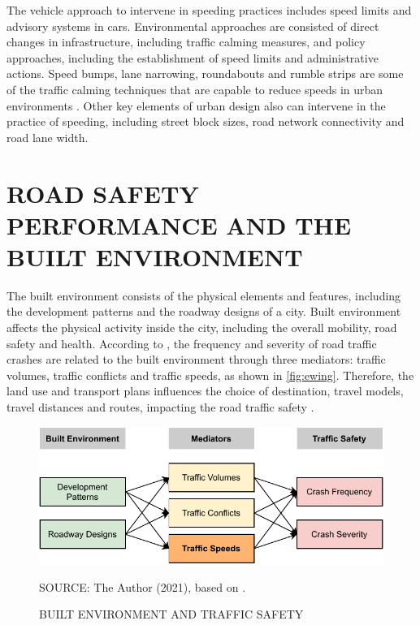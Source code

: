 The vehicle approach to intervene in speeding practices includes speed limits and advisory systems in cars. Environmental approaches are consisted of direct changes in infrastructure, including traffic calming measures, and policy approaches, including the establishment of speed limits and administrative actions. Speed bumps, lane narrowing, roundabouts and rumble strips are some of the traffic calming techniques that are capable to reduce speeds in urban environments \cite{Welle2016}. Other key elements of urban design also can intervene in the practice of speeding, including street block sizes, road network connectivity and road lane width.

\section{ROAD SAFETY PERFORMANCE AND THE BUILT ENVIRONMENT} \label{be}





The built environment consists of the physical elements and features, including the development patterns and the roadway designs of a city. Built environment affects the physical activity inside the city, including the overall mobility, road safety and health. According to \textcite{Ewing2009}, the frequency and severity of road traffic crashes are related to the built environment through three mediators: traffic volumes, traffic conflicts and traffic speeds, as shown in \autoref{fig:ewing}. Therefore, the land use and transport plans influences the choice of destination, travel models, travel distances and routes, impacting the road traffic safety \cite{Tiwari}.  

\begin{figure}[!htbp]
    \centering\footnotesize
    \captionsetup{font=footnotesize}
    \caption{BUILT ENVIRONMENT AND TRAFFIC SAFETY}
    \includegraphics{fig/ewing.pdf}
    \label{fig:ewing}
    \par SOURCE: The Author (2021), based on \textcite{Ewing2009}.
\end{figure}

